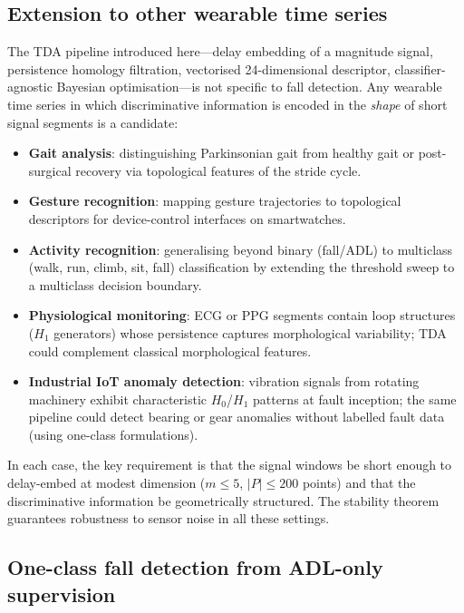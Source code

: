\documentclass[onluarkali,ingilizce,yukseklisans,karton,LisansustuEgitim]{itutez}
\providecommand{\1}{\mathbf{1}}
\begin{document}
\subsection{Extension to other wearable time series}

The TDA pipeline introduced here---delay embedding of a magnitude signal,
persistence homology filtration, vectorised 24-dimensional descriptor,
classifier-agnostic Bayesian optimisation---is not specific to fall detection.
Any wearable time series in which discriminative information is encoded in the
\emph{shape} of short signal segments is a candidate:

\begin{itemize}
  \item \textbf{Gait analysis}: distinguishing Parkinsonian gait from healthy gait
    or post-surgical recovery via topological features of the stride cycle.
  \item \textbf{Gesture recognition}: mapping gesture trajectories to topological
    descriptors for device-control interfaces on smartwatches.
  \item \textbf{Activity recognition}: generalising beyond binary (fall/ADL) to
    multiclass (walk, run, climb, sit, fall) classification by extending the
    threshold sweep to a multiclass decision boundary.
  \item \textbf{Physiological monitoring}: ECG or PPG segments contain loop
    structures ($H_1$ generators) whose persistence captures morphological
    variability; TDA could complement classical morphological features.
  \item \textbf{Industrial IoT anomaly detection}: vibration signals from rotating
    machinery exhibit characteristic $H_0$/$H_1$ patterns at fault inception;
    the same pipeline could detect bearing or gear anomalies without labelled fault data
    (using one-class formulations).
\end{itemize}

In each case, the key requirement is that the signal windows be short enough to
delay-embed at modest dimension ($m\leq5$, $|P|\leq200$ points) and that the
discriminative information be geometrically structured.  The stability theorem
guarantees robustness to sensor noise in all these settings.

\subsection{One-class fall detection from ADL-only supervision}
\label{subsubsec:one-class}
\end{document}
